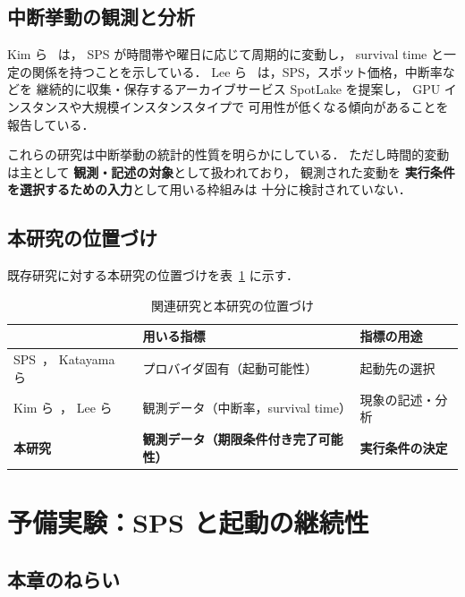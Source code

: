 \documentclass[11pt,a4paper]{ltjsreport}
\begin{document}
\section{中断挙動の観測と分析}

Kim ら~\cite{Kim2024SpotInterruption} は，
SPS が時間帯や曜日に応じて周期的に変動し，
survival time と一定の関係を持つことを示している．
Lee ら~\cite{Lee2022SpotLake} は，SPS，スポット価格，中断率などを
継続的に収集・保存するアーカイブサービス SpotLake を提案し，
GPU インスタンスや大規模インスタンスタイプで
可用性が低くなる傾向があることを報告している．

これらの研究は中断挙動の統計的性質を明らかにしている．
ただし時間的変動は主として
\textbf{観測・記述の対象}として扱われており，
観測された変動を
\textbf{実行条件を選択するための入力}として用いる枠組みは
十分に検討されていない．

\section{本研究の位置づけ}

既存研究に対する本研究の位置づけを表~\ref{tab:related} に示す．

\begin{table}[htbp]
\centering
\caption{関連研究と本研究の位置づけ}
\label{tab:related}
\small
\begin{tabularx}{\textwidth}{@{}lXX@{}}
\toprule
 & \textbf{用いる指標} & \textbf{指標の用途} \\
\midrule
SPS~\cite{AWSSPS}，
Katayama ら~\cite{Katayama2022}
  & プロバイダ固有（起動可能性）
  & 起動先の選択 \\
\addlinespace
Kim ら~\cite{Kim2024SpotInterruption}，
Lee ら~\cite{Lee2022SpotLake}
  & 観測データ（中断率，survival time）
  & 現象の記述・分析 \\
\addlinespace
\textbf{本研究}
  & \textbf{観測データ（期限条件付き完了可能性）}
  & \textbf{実行条件の決定} \\
\bottomrule
\end{tabularx}
\end{table}

\chapter{予備実験：SPS と起動の継続性}
\label{chap:prelim}

\section{本章のねらい}
\end{document}
